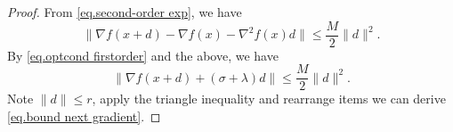 \documentclass{article}
\begin{document}
\begin{proof}
    From \eqref{eq.second-order exp}, we have
    \begin{equation*}
        \|\nabla f(x+d)- \nabla f(x) -\nabla ^2 f(x) d\| \leq \frac{M}{2}\|d\|^2.
    \end{equation*}
    By \eqref{eq.optcond firstorder} and the above, we have
    \begin{equation*}
        \|\nabla f(x+d)+(\sigma+\lambda) d\| \leq \frac{M}{2}\|d\|^2.
    \end{equation*}
    Note $\|d\|\leq r$, apply the triangle inequality and rearrange items we can derive \eqref{eq.bound next gradient}.
\end{proof}






\end{document}
